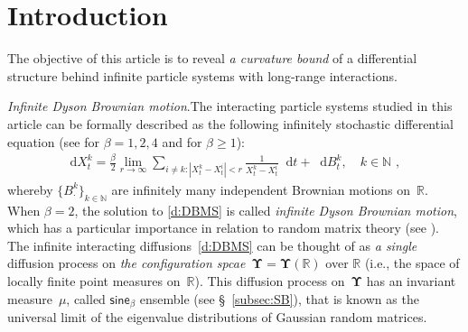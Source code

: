 \documentclass[11pt,letterpaper]{amsart}
\newcommand{\diff}{\mathop{}\!\mathrm{d}}
\newcommand{\N}{{\mathbb N}}
\newcommand{\R}{{\mathbb R}}
\newcommand{\comma}{\,\,\mathrm{,}\;\,}
\newcommand{\purple}[1]{{\color{purple}#1}}
\newcommand{\QP}{{\mu}}
\newcommand{\dUpsilon}{{\mathbf \Upsilon}}
\newcommand{\U}{\dUpsilon}
\newcommand{\sine}{\mathsf{sine}}
\renewcommand{\1}{\mathbf 1}
\numberwithin{equation}{section}
\theoremstyle{plain}
\theoremstyle{definition}
\theoremstyle{remark}
\renewcommand{\paragraph}[1]{\medskip\emph{#1}.\quad}
\begin{document}
\tableofcontents
\section{Introduction}
The objective of this article is to reveal {\it a curvature bound} of a differential structure behind infinite particle systems with long-range interactions. 

\paragraph{Infinite Dyson Brownian motion}The interacting particle systems studied in this article can be formally described as the following infinitely  stochastic differential equation (see \cite{Osa12} for $\beta=1, 2, 4$ and \cite{Tsa16} for $\beta \ge 1$):
\begin{align}  \label{d:DBMS}
\diff X_t^k=    \frac{\beta}{2} \lim_{r \to \infty}\sum_{i \neq k: |X_t^k- X_t^i|<r} \frac{1}{X_t^k- X_t^i} \diff t + \diff B^k_t, \quad k \in \N \comma 
\end{align}
 whereby $\{B_\cdot^k\}_{k\in \N}$ are infinitely many independent Brownian motions on~$\R$. When $\beta=2$, the solution to \eqref{d:DBMS} is called {\it infinite Dyson Brownian motion}, which has a particular importance in relation to random matrix theory (see \cite{Dys62, Spo87, NagFor98, KatTan10, Osa96, Osa13}). The infinite interacting diffusions~\eqref{d:DBMS} can be thought of as {\it a single} diffusion process on {\it the configuration spcae~$\U=\U(\R)$} over $\R$ (i.e., the space of locally finite point measures on~$\R$). This diffusion process on~$\U$ has an invariant measure~$\QP$, called $\sine_\beta$ ensemble (see \S~\ref{subsec:SB}), that is known as the universal limit of the eigenvalue distributions of Gaussian random matrices.
 
\end{document}
